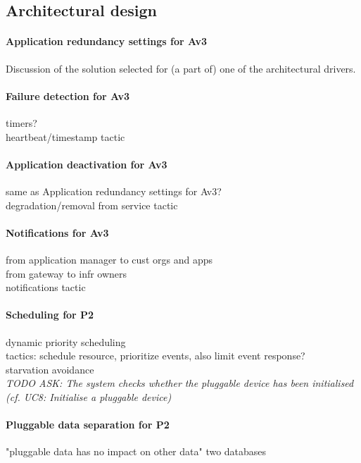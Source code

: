 \subsection{Architectural design}
    \paragraph{Application redundancy settings for Av3}
    Discussion of the solution selected for (a part of) one of the architectural
    drivers.

    \paragraph{Failure detection for Av3}
    timers? \\
    heartbeat/timestamp tactic

    \paragraph{Application deactivation for Av3}
    same as Application redundancy settings for Av3? \\
    degradation/removal from service tactic

    \paragraph{Notifications for Av3}
    from application manager to cust orgs and apps \\
    from gateway to infr owners \\
    notifications tactic

    \paragraph{Scheduling for P2}
    dynamic priority scheduling \\
    tactics: schedule resource, prioritize events, also limit event response?\\
    starvation avoidance \\
    \textit{TODO ASK: The  system  checks  whether  the  pluggable  device
    has  been  initialised (cf. UC8: Initialise  a pluggable device)}

    \paragraph{Pluggable data separation for P2}
    "pluggable data has no impact on other data"
    two databases


